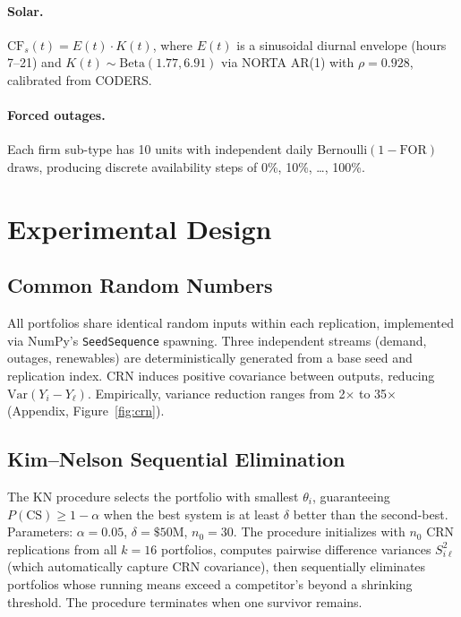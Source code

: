 \documentclass[11pt]{article}
\begin{document}
\paragraph{Solar.}
$\text{CF}_s(t) = E(t) \cdot K(t)$, where $E(t)$ is a sinusoidal diurnal envelope (hours 7--21) and $K(t) \sim \text{Beta}(1.77, 6.91)$ via NORTA AR(1) with $\rho = 0.928$, calibrated from CODERS.

\paragraph{Forced outages.}
Each firm sub-type has 10 units with independent daily Bernoulli$(1 - \text{FOR})$ draws, producing discrete availability steps of 0\%, 10\%, \ldots, 100\%.

\section{Experimental Design}\label{sec:design}

\subsection{Common Random Numbers}

All portfolios share identical random inputs within each replication, implemented via NumPy's \texttt{SeedSequence} spawning. Three independent streams (demand, outages, renewables) are deterministically generated from a base seed and replication index. CRN induces positive covariance between outputs, reducing $\text{Var}(Y_i - Y_\ell)$. Empirically, variance reduction ranges from 2$\times$ to 35$\times$ (Appendix, Figure~\ref{fig:crn}).

\subsection{Kim--Nelson Sequential Elimination}

The KN procedure \citep{KimNelson2001} selects the portfolio with smallest $\theta_i$, guaranteeing $P(\text{CS}) \geq 1 - \alpha$ when the best system is at least $\delta$ better than the second-best. Parameters: $\alpha = 0.05$, $\delta = \$50$M, $n_0 = 30$. The procedure initializes with $n_0$ CRN replications from all $k = 16$ portfolios, computes pairwise difference variances $S^2_{i\ell}$ (which automatically capture CRN covariance), then sequentially eliminates portfolios whose running means exceed a competitor's beyond a shrinking threshold. The procedure terminates when one survivor remains.
\end{document}
